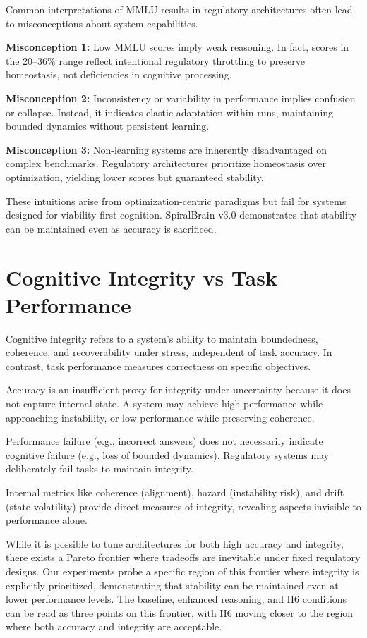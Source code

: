 \documentclass[12pt,a4paper]{article}
\begin{document}
Common interpretations of MMLU results in regulatory architectures often lead to misconceptions about system capabilities.

\textbf{Misconception 1:} Low MMLU scores imply weak reasoning. In fact, scores in the 20–36\% range reflect intentional regulatory throttling to preserve homeostasis, not deficiencies in cognitive processing.

\textbf{Misconception 2:} Inconsistency or variability in performance implies confusion or collapse. Instead, it indicates elastic adaptation within runs, maintaining bounded dynamics without persistent learning.

\textbf{Misconception 3:} Non-learning systems are inherently disadvantaged on complex benchmarks. Regulatory architectures prioritize homeostasis over optimization, yielding lower scores but guaranteed stability.

These intuitions arise from optimization-centric paradigms but fail for systems designed for viability-first cognition. SpiralBrain v3.0 demonstrates that stability can be maintained even as accuracy is sacrificed.

\section{Cognitive Integrity vs Task Performance}

Cognitive integrity refers to a system's ability to maintain boundedness, coherence, and recoverability under stress, independent of task accuracy. In contrast, task performance measures correctness on specific objectives.

Accuracy is an insufficient proxy for integrity under uncertainty because it does not capture internal state. A system may achieve high performance while approaching instability, or low performance while preserving coherence.

Performance failure (e.g., incorrect answers) does not necessarily indicate cognitive failure (e.g., loss of bounded dynamics). Regulatory systems may deliberately fail tasks to maintain integrity.

Internal metrics like coherence (alignment), hazard (instability risk), and drift (state volatility) provide direct measures of integrity, revealing aspects invisible to performance alone.

While it is possible to tune architectures for both high accuracy and integrity, there exists a Pareto frontier where tradeoffs are inevitable under fixed regulatory designs. Our experiments probe a specific region of this frontier where integrity is explicitly prioritized, demonstrating that stability can be maintained even at lower performance levels. The baseline, enhanced reasoning, and H6 conditions can be read as three points on this frontier, with H6 moving closer to the region where both accuracy and integrity are acceptable.
\end{document}
